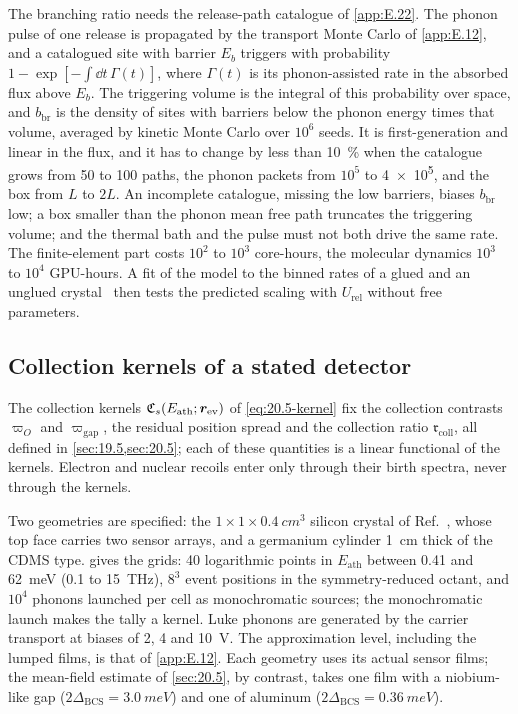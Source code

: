 The branching ratio needs the release-path catalogue of \cref{app:E.22}. The phonon pulse of one release is propagated by the transport Monte Carlo of \cref{app:E.12}, and a catalogued site with barrier $E_b$ triggers with probability $1 - \exp[-\int\dd t\,\varGamma(t)]$, where $\varGamma(t)$ is its phonon-assisted rate in the absorbed flux above $E_b$. The triggering volume is the integral of this probability over space, and $b_{\mathrm{br}}$ is the density of sites with barriers below the phonon energy times that volume, averaged by kinetic Monte Carlo over $10^6$ seeds. It is first-generation and linear in the flux, and it has to change by less than \SI{10}{\percent} when the catalogue grows from 50 to 100 paths, the phonon packets from $10^5$ to \num{4e5}, and the box from $L$ to $2L$. An incomplete catalogue, missing the low barriers, biases $b_{\mathrm{br}}$ low; a box smaller than the phonon mean free path truncates the triggering volume; and the thermal bath and the pulse must not both drive the same rate. The finite-element part costs $10^{2}$ to $10^{3}$ core-hours, the molecular dynamics $10^{3}$ to $10^{4}$ GPU-hours. A fit of the model to the binned rates of a glued and an unglued crystal~\cite{anthonypetersen2024stress} then tests the predicted scaling with $U_{\mathrm{rel}}$ without free parameters.

\subsection{Collection kernels of a stated detector}

The collection kernels $\mathfrak{C}_s(E_{\mathrm{ath}};\bm{r}_{\mathrm{ev}})$ of \cref{eq:20.5-kernel} fix the collection contrasts $\varpi_O$ and $\varpi_{\mathrm{gap}}$, the residual position spread and the collection ratio $\mathfrak{r}_{\mathrm{coll}}$, all defined in \cref{sec:19.5,sec:20.5}; each of these quantities is a linear functional of the kernels. Electron and nuclear recoils enter only through their birth spectra, never through the kernels.

Two geometries are specified: the $1 \times 1 \times \SI{0.4}{cm^3}$ silicon crystal of Ref.~\cite{ren2021design}, whose top face carries two sensor arrays, and a germanium cylinder \SI{1}{cm} thick of the CDMS type.  gives the grids: 40 logarithmic points in $E_{\mathrm{ath}}$ between 0.41 and \SI{62}{meV} (0.1 to \SI{15}{THz}), $8^3$ event positions in the symmetry-reduced octant, and $10^4$ phonons launched per cell as monochromatic sources; the monochromatic launch makes the tally a kernel. Luke phonons are generated by the carrier transport at biases of 2, 4 and \SI{10}{V}. The approximation level, including the lumped films, is that of \cref{app:E.12}. Each geometry uses its actual sensor films; the mean-field estimate of \cref{sec:20.5}, by contrast, takes one film with a niobium-like gap ($2\Delta_{\mathrm{BCS}} = \SI{3.0}{meV}$) and one of aluminum ($2\Delta_{\mathrm{BCS}} = \SI{0.36}{meV}$).

